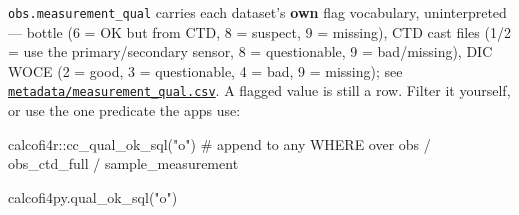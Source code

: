 \documentclass[
  letterpaper,
  DIV=11,
  numbers=noendperiod]{scrreprt}
\newenvironment{Shaded}{\begin{snugshade}}{\end{snugshade}}
\newcommand{\CommentTok}[1]{\textcolor[rgb]{0.37,0.37,0.37}{#1}}
\newcommand{\FunctionTok}[1]{\textcolor[rgb]{0.28,0.35,0.67}{#1}}
\newcommand{\NormalTok}[1]{\textcolor[rgb]{0.00,0.23,0.31}{#1}}
\newcommand{\SpecialCharTok}[1]{\textcolor[rgb]{0.37,0.37,0.37}{#1}}
\newcommand{\StringTok}[1]{\textcolor[rgb]{0.13,0.47,0.30}{#1}}
\begin{document}
\begin{tcolorbox}[enhanced jigsaw, arc=.35mm, colback=white, left=2mm, leftrule=.75mm, titlerule=0mm, bottomrule=.15mm, colbacktitle=quarto-callout-important-color!10!white, colframe=quarto-callout-important-color-frame, rightrule=.15mm, title=\textcolor{quarto-callout-important-color}{\faExclamation}\hspace{0.5em}{Apply the quality flags}, breakable, opacityback=0, toptitle=1mm, toprule=.15mm, coltitle=black, bottomtitle=1mm, opacitybacktitle=0.6]

\texttt{obs.measurement\_qual} carries each dataset's \textbf{own} flag
vocabulary, uninterpreted --- bottle (6 = OK but from CTD, 8 = suspect,
9 = missing), CTD cast files (1/2 = use the primary/secondary sensor, 8
= questionable, 9 = bad/missing), DIC WOCE (2 = good, 3 = questionable,
4 = bad, 9 = missing); see
\href{https://github.com/CalCOFI/workflows/blob/main/metadata/measurement_qual.csv}{\texttt{metadata/measurement\_qual.csv}}.
A flagged value is still a row. Filter it yourself, or use the one
predicate the apps use:

\begin{Shaded}
\begin{Highlighting}[]
\NormalTok{calcofi4r}\SpecialCharTok{::}\FunctionTok{cc\_qual\_ok\_sql}\NormalTok{(}\StringTok{"o"}\NormalTok{)     }\CommentTok{\# append to any WHERE over obs / obs\_ctd\_full / sample\_measurement}
\end{Highlighting}
\end{Shaded}

\begin{Shaded}
\begin{Highlighting}[]
\NormalTok{calcofi4py.qual\_ok\_sql(}\StringTok{"o"}\NormalTok{)}
\end{Highlighting}
\end{Shaded}


\end{tcolorbox}
\end{document}
